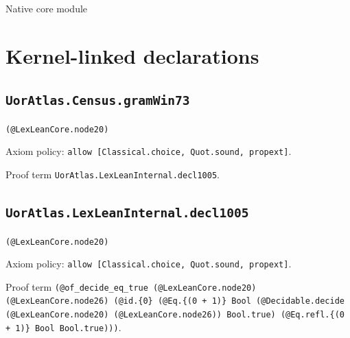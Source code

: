 \documentclass[11pt]{article}
\begin{document}
\begin{center}{\LARGE Native core module}\end{center}
\section*{Kernel-linked declarations}
\subsection*{\texttt{UorAtlas.Census.gramWin73}}
\noindent\texttt{(@LexLeanCore.node20)}\par
\noindent Axiom policy: \texttt{allow [Classical.choice, Quot.sound, propext]}.\par
\noindent Proof term \texttt{UorAtlas.LexLeanInternal.decl1005}.\par
\subsection*{\texttt{UorAtlas.LexLeanInternal.decl1005}}
\noindent\texttt{(@LexLeanCore.node20)}\par
\noindent Axiom policy: \texttt{allow [Classical.choice, Quot.sound, propext]}.\par
\noindent Proof term \texttt{(@of\_decide\_eq\_true (@LexLeanCore.node20) (@LexLeanCore.node26) (@id.\{0\} (@Eq.\{(0 + 1)\} Bool (@Decidable.decide (@LexLeanCore.node20) (@LexLeanCore.node26)) Bool.true) (@Eq.refl.\{(0 + 1)\} Bool Bool.true)))}.\par
\end{document}
